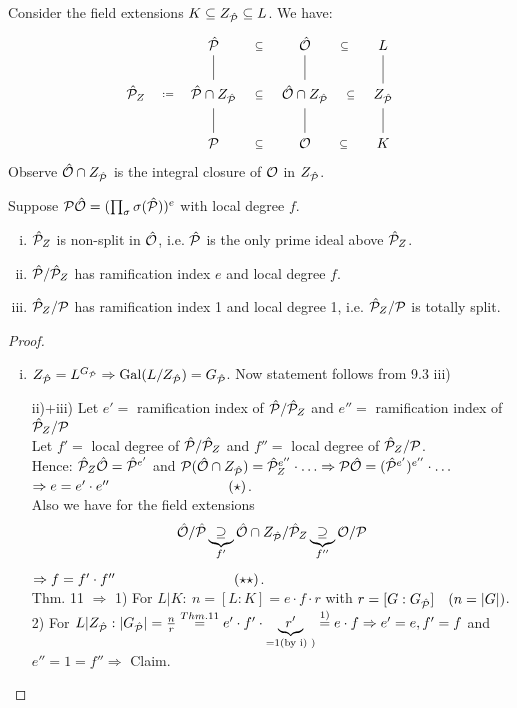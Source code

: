 Consider the field extensions $K \subseteq Z_{\hat{\mathcal{P}}} \subseteq L$. We have:\\
\[ \begin{tikzcd}
 &	\hP	\arrow[draw=none]{r}[sloped,auto=false]{\subseteq} & \hO \arrow[draw=none]{r}[sloped,auto=false]{\subseteq} & L\\
 \hP_Z \arrow[draw=none]{r}[sloped,auto=false]{:=} & \hP \cap \ZP \arrow[dash]{u} \arrow[draw=none]{r}[sloped,auto=false]{\subseteq} &\hO\cap \ZP \arrow[dash]{u} \arrow[draw=none]{r}[sloped,auto=false]{\subseteq} & \ZP \arrow[dash]{u} \\
 & \PP \arrow[dash]{u} \arrow[draw=none]{r}[sloped,auto=false]{\subseteq} & \O \arrow[dash]{u} \arrow[draw=none]{r}[sloped,auto=false]{\subseteq} &K \arrow[dash]{u}
\end{tikzcd}
\]
Observe $\hat{\mathcal{O}} \cap Z_{\hat{\mathcal{P}}}$ is the integral closure of $\mathcal{O}$ in $Z_{\hat{\mathcal{P}}}$.

\begin{Prop}
Suppose $\mathcal{P} \hat{\mathcal{O}} = (\prod_\sigma \sigma(\hat{\mathcal{P}}))^e$ with local degree $f$.
\begin{enumerate}[i)]
\item $\hat{\mathcal{P}}_Z$ is non-split in $\hat{\mathcal{O}}$, i.e. $\hat{\mathcal{P}}$ is the only prime ideal above $\hat{\mathcal{P}}_Z$.
\item $\hat{\mathcal{P}}/\hat{\mathcal{P}}_Z$ has ramification index $e$ and local degree $f$.
\item $\hat{\mathcal{P}}_Z/\mathcal{P}$ has ramification index 1 and local degree 1, i.e. $\hat{\mathcal{P}}_Z/\mathcal{P}$ is totally split.
\end{enumerate}
\end{Prop}

\begin{proof}
\begin{enumerate}[i)]
\item $Z_{\hat{\mathcal{P}}} = L^{G_{\hat{\mathcal{P}}}} \Rightarrow \operatorname{Gal}(L/Z_{\hat{\mathcal{P}}}) = G_{\hat{\mathcal{P}}}$. Now statement follows from 9.3 iii)
\item[ii)+iii)]  Let $e'=$ ramification index of $\hat{\mathcal{P}}/\hat{\mathcal{P}}_Z$ and $e'' = $ ramification index of $\hat{\mathcal{P}}_Z/\mathcal{P}$\\
Let $f'=$ local degree of $\hat{\mathcal{P}}/\hat{\mathcal{P}}_Z$ and $f'' = $ local degree of $\hat{\mathcal{P}}_Z/\mathcal{P}$.\\
Hence: $\hat{\mathcal{P}}_Z\hat{\mathcal{O}}=\hat{\mathcal{P}}^{e'}$ and $\mathcal{P}(\hat{\mathcal{O}} \cap Z_{\hat{\mathcal{P}}})= \hat{\mathcal{P}}_Z^{e''} \cdot \ldots \Rightarrow \mathcal{P} \hat{\mathcal{O}} = (\hat{\mathcal{P}}^{e'})^{e''} \cdot \ldots$\\
$\Rightarrow e=e'\cdot e'' \hspace*{3cm} (\star)$.\\
Also we have for the field extensions
\[ \hat{\mathcal{O}}/\hat{\mathcal{P}} \underbrace{\supseteq}_{f'} \hat{\mathcal{O}}\cap Z_{\hat{\mathcal{P}}}/\hat{\mathcal{P}}_Z \underbrace{\supseteq}_{f''} \mathcal{O}/\mathcal{P}\]
$\Rightarrow f=f' \cdot f'' \hspace*{3cm} (\star \star)$.\\
Thm. 11 $\Rightarrow$ 1) For $L|K:\ n=[L:K]=e\cdot f\cdot r$ with $r = [G : G_{\hat{\mathcal{P}}}] \quad (n=|G|)$.\\
2) For $L|Z_{\hat{\mathcal{P}}}: |G_{\hat{\mathcal{P}}}|=\frac{n}{r} \stackrel{Thm. 11}{=} e'\cdot f' \cdot \underbrace{r'}_{=1 \text{(by i) )}} \stackrel{1)}{=} e\cdot f \Rightarrow e'=e, f'=f$ and $e''=1=f'' \Rightarrow$ Claim.
\end{enumerate}
\end{proof}

